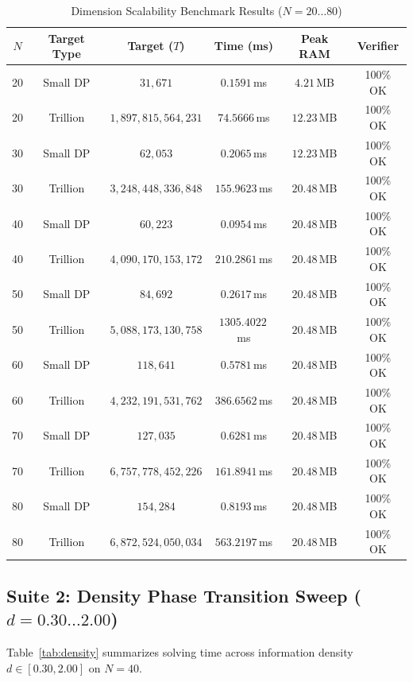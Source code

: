 \documentclass[journal,onecolumn,11pt]{IEEEtran}
\begin{document}
\begin{table}[h]
\centering
\caption{Dimension Scalability Benchmark Results ($N = 20 \dots 80$)}
\label{tab:scalability}
\renewcommand{\arraystretch}{1.15}
\begin{tabular}{cccccc}
\hline
$N$ & Target Type & Target ($T$) & Time (ms) & Peak RAM & Verifier \\
\hline
20 & Small DP & $31{,}671$ & $0.1591$\,ms & $4.21$\,MB & 100\% OK \\
20 & Trillion & $1{,}897{,}815{,}564{,}231$ & $74.5666$\,ms & $12.23$\,MB & 100\% OK \\
30 & Small DP & $62{,}053$ & $0.2065$\,ms & $12.23$\,MB & 100\% OK \\
30 & Trillion & $3{,}248{,}448{,}336{,}848$ & $155.9623$\,ms & $20.48$\,MB & 100\% OK \\
40 & Small DP & $60{,}223$ & $0.0954$\,ms & $20.48$\,MB & 100\% OK \\
40 & Trillion & $4{,}090{,}170{,}153{,}172$ & $210.2861$\,ms & $20.48$\,MB & 100\% OK \\
50 & Small DP & $84{,}692$ & $0.2617$\,ms & $20.48$\,MB & 100\% OK \\
50 & Trillion & $5{,}088{,}173{,}130{,}758$ & $1305.4022$\,ms & $20.48$\,MB & 100\% OK \\
60 & Small DP & $118{,}641$ & $0.5781$\,ms & $20.48$\,MB & 100\% OK \\
60 & Trillion & $4{,}232{,}191{,}531{,}762$ & $386.6562$\,ms & $20.48$\,MB & 100\% OK \\
70 & Small DP & $127{,}035$ & $0.6281$\,ms & $20.48$\,MB & 100\% OK \\
70 & Trillion & $6{,}757{,}778{,}452{,}226$ & $161.8941$\,ms & $20.48$\,MB & 100\% OK \\
80 & Small DP & $154{,}284$ & $0.8193$\,ms & $20.48$\,MB & 100\% OK \\
80 & Trillion & $6{,}872{,}524{,}050{,}034$ & $563.2197$\,ms & $20.48$\,MB & 100\% OK \\
\hline
\end{tabular}
\end{table}

\subsection{Suite 2: Density Phase Transition Sweep ($d = 0.30 \dots 2.00$)}
Table~\ref{tab:density} summarizes solving time across information density $d \in [0.30, 2.00]$ on $N=40$.
\end{document}
